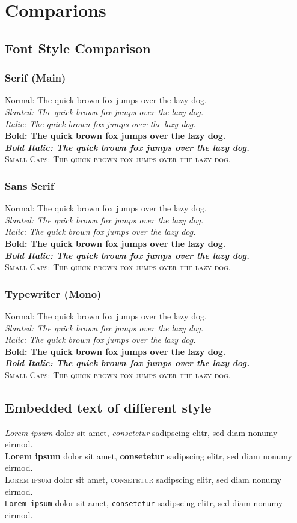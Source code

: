 \chapter{Comparions}

\section{Font Style Comparison}

\newcommand{\foxtest}[1]{%
  {#1 Normal: The quick brown fox jumps over the lazy dog.} \\
  {#1 \textsl{Slanted: The quick brown fox jumps over the lazy dog.}} \\
  {#1 \textit{Italic: The quick brown fox jumps over the lazy dog.}} \\
  {#1 \textbf{Bold: The quick brown fox jumps over the lazy dog.}} \\
  {#1 \textbf{\textit{Bold Italic: The quick brown fox jumps over the lazy dog.}}} \\
  {#1 \textsc{Small Caps: The quick brown fox jumps over the lazy dog.}}\par
}

\subsection{Serif (Main)}
\foxtest{\rmfamily}

\subsection{Sans Serif}
\foxtest{\sffamily}

\subsection{Typewriter (Mono)}
\foxtest{\ttfamily}



\section{Embedded text of different style}

\textit{Lorem ipsum} dolor sit amet, \textit{consetetur} sadipscing elitr, sed diam nonumy eirmod.\\
\textbf{Lorem ipsum} dolor sit amet, \textbf{consetetur} sadipscing elitr, sed diam nonumy eirmod.\\
\textsc{Lorem ipsum} dolor sit amet, \textsc{consetetur} sadipscing elitr, sed diam nonumy eirmod.\\
\texttt{Lorem ipsum} dolor sit amet, \texttt{consetetur} sadipscing elitr, sed diam nonumy eirmod.\par



